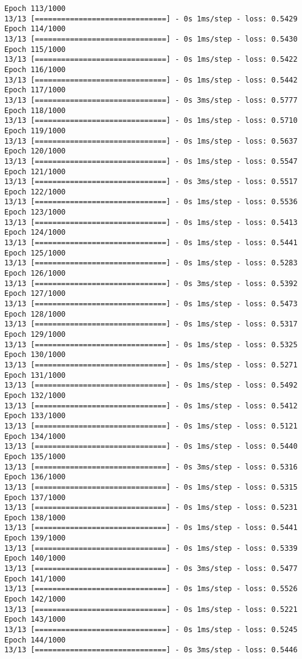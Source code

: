 \documentclass[11pt]{article}
\begin{document}
\begin{Verbatim}[commandchars=\\\{\}]
Epoch 113/1000
13/13 [==============================] - 0s 1ms/step - loss: 0.5429
Epoch 114/1000
13/13 [==============================] - 0s 1ms/step - loss: 0.5430
Epoch 115/1000
13/13 [==============================] - 0s 1ms/step - loss: 0.5422
Epoch 116/1000
13/13 [==============================] - 0s 1ms/step - loss: 0.5442
Epoch 117/1000
13/13 [==============================] - 0s 3ms/step - loss: 0.5777
Epoch 118/1000
13/13 [==============================] - 0s 1ms/step - loss: 0.5710
Epoch 119/1000
13/13 [==============================] - 0s 1ms/step - loss: 0.5637
Epoch 120/1000
13/13 [==============================] - 0s 1ms/step - loss: 0.5547
Epoch 121/1000
13/13 [==============================] - 0s 3ms/step - loss: 0.5517
Epoch 122/1000
13/13 [==============================] - 0s 1ms/step - loss: 0.5536
Epoch 123/1000
13/13 [==============================] - 0s 1ms/step - loss: 0.5413
Epoch 124/1000
13/13 [==============================] - 0s 1ms/step - loss: 0.5441
Epoch 125/1000
13/13 [==============================] - 0s 1ms/step - loss: 0.5283
Epoch 126/1000
13/13 [==============================] - 0s 3ms/step - loss: 0.5392
Epoch 127/1000
13/13 [==============================] - 0s 1ms/step - loss: 0.5473
Epoch 128/1000
13/13 [==============================] - 0s 1ms/step - loss: 0.5317
Epoch 129/1000
13/13 [==============================] - 0s 1ms/step - loss: 0.5325
Epoch 130/1000
13/13 [==============================] - 0s 1ms/step - loss: 0.5271
Epoch 131/1000
13/13 [==============================] - 0s 1ms/step - loss: 0.5492
Epoch 132/1000
13/13 [==============================] - 0s 1ms/step - loss: 0.5412
Epoch 133/1000
13/13 [==============================] - 0s 1ms/step - loss: 0.5121
Epoch 134/1000
13/13 [==============================] - 0s 1ms/step - loss: 0.5440
Epoch 135/1000
13/13 [==============================] - 0s 3ms/step - loss: 0.5316
Epoch 136/1000
13/13 [==============================] - 0s 1ms/step - loss: 0.5315
Epoch 137/1000
13/13 [==============================] - 0s 1ms/step - loss: 0.5231
Epoch 138/1000
13/13 [==============================] - 0s 1ms/step - loss: 0.5441
Epoch 139/1000
13/13 [==============================] - 0s 1ms/step - loss: 0.5339
Epoch 140/1000
13/13 [==============================] - 0s 3ms/step - loss: 0.5477
Epoch 141/1000
13/13 [==============================] - 0s 1ms/step - loss: 0.5526
Epoch 142/1000
13/13 [==============================] - 0s 1ms/step - loss: 0.5221
Epoch 143/1000
13/13 [==============================] - 0s 1ms/step - loss: 0.5245
Epoch 144/1000
13/13 [==============================] - 0s 3ms/step - loss: 0.5446

\end{Verbatim}
\end{document}
